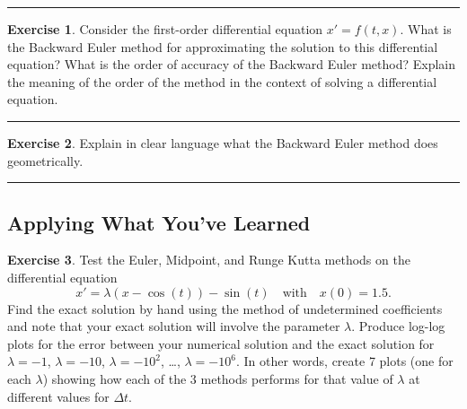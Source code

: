 \documentclass[
]{book}
\theoremstyle{definition}
\theoremstyle{definition}
\theoremstyle{definition}
\newtheorem{exercise}{Exercise}[chapter]
\theoremstyle{remark}
\begin{document}
\begin{center}\rule{0.5\linewidth}{0.5pt}\end{center}

\begin{exercise}
\protect\hypertarget{exr:unnamed-chunk-494}{}{\label{exr:unnamed-chunk-494} }Consider the first-order differential equation \(x' = f(t,x)\). What is
the Backward Euler method for approximating the solution to this
differential equation? What is the order of accuracy of the Backward Euler
method? Explain the meaning of the order of the method in the context of
solving a differential equation.
\end{exercise}

\begin{center}\rule{0.5\linewidth}{0.5pt}\end{center}

\begin{exercise}
\protect\hypertarget{exr:unnamed-chunk-495}{}{\label{exr:unnamed-chunk-495} }Explain in clear language what the Backward Euler method does
geometrically.
\end{exercise}

\begin{center}\rule{0.5\linewidth}{0.5pt}\end{center}

\hypertarget{applying-what-youve-learned-4}{%
\subsection{Applying What You've Learned}\label{applying-what-youve-learned-4}}

\begin{exercise}
\protect\hypertarget{exr:unnamed-chunk-496}{}{\label{exr:unnamed-chunk-496} }Test the Euler, Midpoint, and Runge Kutta methods on the differential
equation
\[x' = \lambda \left( x - \cos(t) \right) - \sin(t) \quad \text{with} \quad x(0) = 1.5.\]
Find the exact solution by hand using the method of undetermined
coefficients and note that your exact solution will involve the
parameter \(\lambda\). Produce log-log plots for the error between your
numerical solution and the exact solution for \(\lambda =  -1\), \(\lambda = -10\), \(\lambda = -10^2\), \ldots, \(\lambda = -10^6\). In
other words, create 7 plots (one for each \(\lambda\)) showing how each of
the 3 methods performs for that value of \(\lambda\) at different values
for \(\Delta t\).
\end{exercise}
\end{document}
